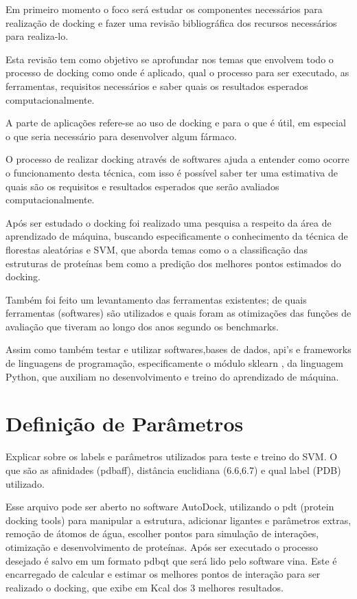 \documentclass[tcc, capa]{texucpel}
\begin{document}
Em primeiro momento o foco será estudar os componentes necessários para realização de docking e  fazer uma revisão bibliográfica dos recursos necessários para realiza-lo.

Esta revisão tem como objetivo se aprofundar nos temas que envolvem todo o processo de docking como onde é aplicado, qual o processo para ser executado, as ferramentas, requisitos necessários  e saber quais os resultados esperados computacionalmente.

A parte de aplicações refere-se ao uso de docking e para o que é útil,  em especial o que seria necessário para desenvolver algum fármaco.

O processo de realizar docking através de softwares ajuda a entender como ocorre o funcionamento desta técnica, com isso é possível saber ter uma estimativa de quais são os requisitos e resultados esperados que serão avaliados computacionalmente.

Após ser estudado o docking foi realizado uma pesquisa a respeito da área de aprendizado de máquina, buscando especificamente o conhecimento da técnica de florestas aleatórias e SVM, que aborda temas como o a classificação das estruturas de proteínas bem como a predição dos melhores pontos estimados do docking.

Também foi feito um levantamento das ferramentas existentes; de quais ferramentas (softwares) são utilizados e quais foram as otimizações das funções de avaliação que tiveram ao longo dos anos segundo os benchmarks.

Assim como também testar e utilizar softwares,bases de dados, api's e frameworks de linguagens de programação, especificamente o módulo sklearn \cite{scikit-learn}, da linguagem Python, que auxiliam no desenvolvimento e treino do aprendizado de máquina.


\section{Definição de Parâmetros}

Explicar sobre os labels e parâmetros utilizados para teste e treino do SVM.
O que são as afinidades (pdbaff), distância euclidiana (6.6,6.7) e qual label (PDB) utilizado.

Esse arquivo pode ser aberto no software AutoDock, utilizando o pdt (protein docking tools) para manipular a estrutura, adicionar ligantes e parâmetros extras, remoção de átomos de água, escolher pontos para simulação de interações, otimização e desenvolvimento de proteínas. 
Após ser executado o processo desejado é salvo em um formato pdbqt que será lido pelo software vina. Este é encarregado de calcular e estimar os melhores pontos de interação para ser realizado o docking, que exibe em Kcal dos 3 melhores resultados.
\end{document}
